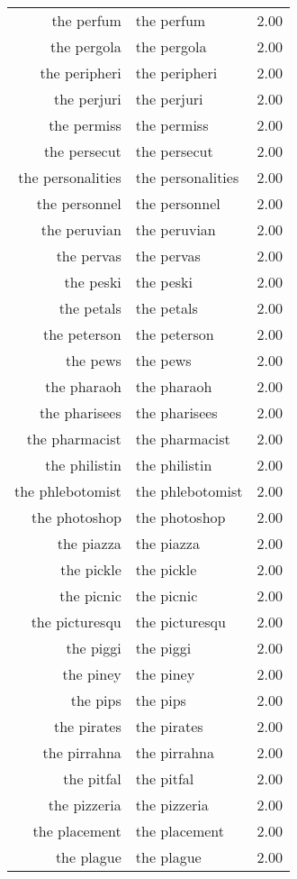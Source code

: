\begin{table}[ht]
\begin{tabular}{rlr}
  the perfum & the perfum & 2.00 \\ 
  the pergola & the pergola & 2.00 \\ 
  the peripheri & the peripheri & 2.00 \\ 
  the perjuri & the perjuri & 2.00 \\ 
  the permiss & the permiss & 2.00 \\ 
  the persecut & the persecut & 2.00 \\ 
  the personalities & the personalities & 2.00 \\ 
  the personnel & the personnel & 2.00 \\ 
  the peruvian & the peruvian & 2.00 \\ 
  the pervas & the pervas & 2.00 \\ 
  the peski & the peski & 2.00 \\ 
  the petals & the petals & 2.00 \\ 
  the peterson & the peterson & 2.00 \\ 
  the pews & the pews & 2.00 \\ 
  the pharaoh & the pharaoh & 2.00 \\ 
  the pharisees & the pharisees & 2.00 \\ 
  the pharmacist & the pharmacist & 2.00 \\ 
  the philistin & the philistin & 2.00 \\ 
  the phlebotomist & the phlebotomist & 2.00 \\ 
  the photoshop & the photoshop & 2.00 \\ 
  the piazza & the piazza & 2.00 \\ 
  the pickle & the pickle & 2.00 \\ 
  the picnic & the picnic & 2.00 \\ 
  the picturesqu & the picturesqu & 2.00 \\ 
  the piggi & the piggi & 2.00 \\ 
  the piney & the piney & 2.00 \\ 
  the pips & the pips & 2.00 \\ 
  the pirates & the pirates & 2.00 \\ 
  the pirrahna & the pirrahna & 2.00 \\ 
  the pitfal & the pitfal & 2.00 \\ 
  the pizzeria & the pizzeria & 2.00 \\ 
  the placement & the placement & 2.00 \\ 
  the plague & the plague & 2.00 \\ 

\end{tabular}
\end{table}
